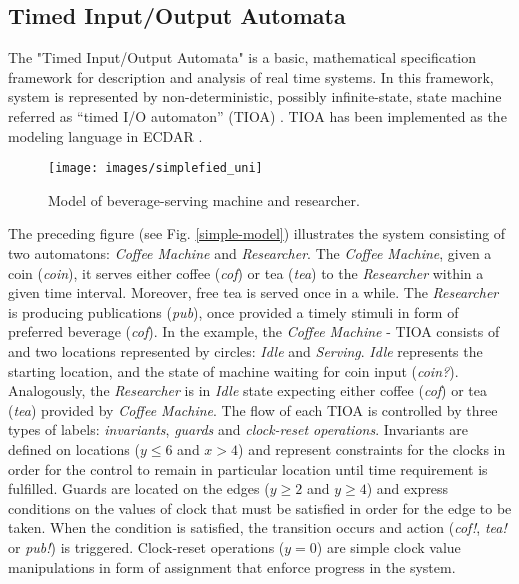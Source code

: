\subsection{Timed Input/Output Automata}
\label{background-tioa}

The "Timed Input/Output Automata" is a basic, mathematical specification
framework for description and analysis of real time systems.  In this framework,
system is represented by non-deterministic, possibly infinite-state, state
machine referred as “timed I/O automaton” (TIOA)
\cite{Kaynar:2006:TTI:1203437}. TIOA has been implemented as the modeling
language in ECDAR \cite{conf/atva/DavidLLNW10}.

\begin{figure}[t]
\label{simple-model}
\begin{centering}
\texttt{[image: images/simplefied\_uni]}
\par\end{centering}
\caption{Model of beverage-serving machine and researcher.}
\label{bev-machine}
\end{figure}

The preceding figure (see Fig. \ref{simple-model}) illustrates the system
consisting of two automatons: \emph{Coffee Machine} and \emph{Researcher}.  The
\emph{Coffee Machine}, given a coin (\emph{coin}), it serves either coffee
(\emph{cof}) or tea (\emph{tea}) to the \emph{Researcher} within a given time
interval. Moreover, free tea is served once in a while. The \emph{Researcher} is
producing publications (\emph{pub}), once provided a timely stimuli in form of
preferred beverage (\emph{cof}).  In the example, the \emph{Coffee Machine} -
TIOA consists of and two locations represented by circles: \emph{Idle} and
\emph{Serving}. \emph{Idle} represents the starting location, and the state of
machine waiting for coin input (\emph{coin?}). Analogously, the
\emph{Researcher} is in \emph{Idle} state expecting either coffee (\emph{cof})
or tea (\emph{tea}) provided by \emph{Coffee Machine}.  The flow of each TIOA is
controlled by three types of labels: \emph{invariants}, \emph{guards} and
\emph{clock-reset operations}.  Invariants are defined on locations ($y\leq 6$
and $x > 4$) and represent constraints for the clocks in order for the
control to remain in particular location until time requirement is fulfilled.
Guards are located on the edges ($y\geq 2$ and $y\geq 4$) and express conditions
on the values of clock that must be satisfied in order for the edge to be
taken. When the condition is satisfied, the transition occurs and action
(\emph{cof!}, \emph{tea!} or \emph{pub!}) is triggered. Clock-reset operations
($y=0$) are simple clock value manipulations in form of assignment that enforce
progress in the system.

